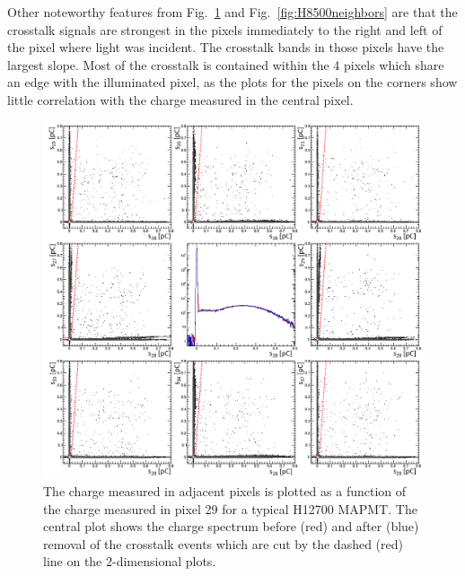 Other noteworthy features from Fig.~\ref{fig:H12700neighbors} and Fig.~\ref{fig:H8500neighbors} are that the crosstalk signals are strongest in the pixels immediately to the right and left of the pixel where light was incident. The crosstalk bands in those pixels have the largest slope. Most of the crosstalk is contained within the 4 pixels which share an edge with the illuminated pixel, as the plots for the pixels on the corners show little correlation with the charge measured in the central pixel.

\begin{figure}[hbt]
	\centering
	\includegraphics[width=\linewidth]{figures/H12700_ct.png}
	\caption{The charge measured in adjacent pixels is plotted as a function of the charge measured in pixel 29 for a typical H12700 MAPMT. The central plot shows the charge spectrum before (red) and after (blue) removal of the crosstalk events which are cut by the dashed (red) line on the 2-dimensional plots.}
	\label{fig:H12700neighbors}
\end{figure}
